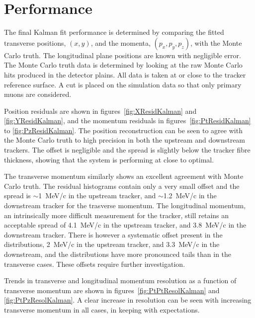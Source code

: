 \section{Performance}
\label{sec:Performance}

  The final Kalman fit performance is determined by comparing the fitted transverse positions, $(x,y)$, and the momenta, $(p_x, p_y, p_z)$, with the Monte Carlo truth. The longitudinal plane positions are known with negligible error. The Monte Carlo truth data is determined by looking at the raw Monte Carlo hits produced in the detector plains.  All data is taken at or close to the tracker reference surface. A cut is placed on the simulation data so that only primary muons are considered. 
  
  Position residuals are shown in figures~\ref{fig:XResidKalman} and \ref{fig:YResidKalman}, and the momentum residuals in figures~\ref{fig:PtResidKalman} to \ref{fig:PzResidKalman}.  The position reconstruction can be seen to agree with the Monte Carlo truth to high precision in both the upstream and downstream trackers. The offset is negligible and the spread is slightly below the tracker fibre thickness, showing that the system is performing at close to optimal.
  
  The transverse momentum similarly shows an excellent agreement with Monte Carlo truth. The residual histograms contain only a very small offset and the spread is $\sim$1~MeV/c in the upstream tracker, and $\sim$1.2~MeV/c in the downstream tracker for the trasverse momentum.  The longitudinal momentum, an intrinsically more difficult measurement for the tracker, still retains an acceptable spread of 4.1~MeV/c in the upstream tracker, and 3.8~MeV/c in the downstream tracker.  There is however a systematic offset present in the distributions, 2~MeV/c in the upstream tracker, and 3.3~MeV/c in the downstream, and the distributions have more pronounced tails than in the transverse cases.  These offsets require further investigation.
  
  Trends in transverse and longitudinal momentum resolution as a function of transverse momentum are shown in figures~\ref{fig:PtPtResolKalman} and \ref{fig:PtPzResolKalman}. A clear increase in resolution can be seen with increasing transverse momentum in all cases, in keeping with expectations.

